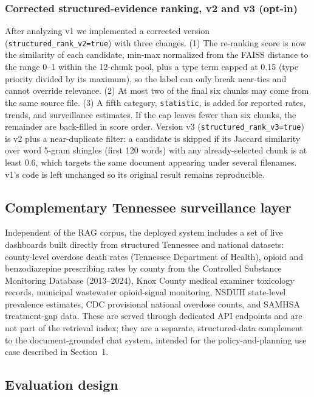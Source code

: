\documentclass[11pt]{article}
\begin{document}
\subsubsection*{Corrected structured-evidence ranking, v2 and v3 (opt-in)}

After analyzing v1 we implemented a corrected version (\texttt{structured\_rank\_v2=true}) with three changes. (1) The re-ranking score is now the similarity of each candidate, min-max normalized from the FAISS distance to the range 0--1 within the 12-chunk pool, plus a type term capped at 0.15 (type priority divided by its maximum), so the label can only break near-ties and cannot override relevance. (2) At most two of the final six chunks may come from the same source file. (3) A fifth category, \texttt{statistic}, is added for reported rates, trends, and surveillance estimates. If the cap leaves fewer than six chunks, the remainder are back-filled in score order. Version v3 (\texttt{structured\_rank\_v3=true}) is v2 plus a near-duplicate filter: a candidate is skipped if its Jaccard similarity over word 5-gram shingles (first 120 words) with any already-selected chunk is at least 0.6, which targets the same document appearing under several filenames. v1's code is left unchanged so its original result remains reproducible.

\subsection{Complementary Tennessee surveillance layer}

Independent of the RAG corpus, the deployed system includes a set of live dashboards built directly from structured Tennessee and national datasets: county-level overdose death rates (Tennessee Department of Health), opioid and benzodiazepine prescribing rates by county from the Controlled Substance Monitoring Database (2013--2024), Knox County medical examiner toxicology records, municipal wastewater opioid-signal monitoring, NSDUH state-level prevalence estimates, CDC provisional national overdose counts, and SAMHSA treatment-gap data. These are served through dedicated API endpoints and are not part of the retrieval index; they are a separate, structured-data complement to the document-grounded chat system, intended for the policy-and-planning use case described in Section~1.

\subsection{Evaluation design}
\end{document}
